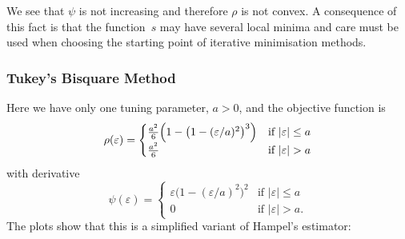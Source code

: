 \documentclass[
  a4paper,
]{article}
\theoremstyle{definition}
\theoremstyle{definition}
\theoremstyle{definition}
\theoremstyle{definition}
\theoremstyle{remark}
\begin{document}
We see that \(\psi\) is not increasing and therefore \(\rho\) is not convex. A
consequence of this fact is that the function~\(s\) may have several local minima
and care must be used when choosing the starting point of iterative
minimisation methods.

\hypertarget{tukeys-bisquare-method}{%
\subsubsection{Tukey's Bisquare Method}\label{tukeys-bisquare-method}}

Here we have only one tuning parameter, \(a > 0\), and the objective
function is
\begin{equation*}
  \rho(\varepsilon)
  = \begin{cases}
  \frac{a^2}{6} \Bigl( 1 - \bigl( 1 - (\varepsilon/a)^2 \bigr)^3 \Bigr)
                & \mbox{if } |\varepsilon| \leq a \\
  \frac{a^2}{6} & \mbox{if } |\varepsilon| > a
  \end{cases}
\end{equation*}
with derivative
\begin{equation*}
  \psi(\varepsilon)
  = \begin{cases}
  \varepsilon\bigl( 1 - (\varepsilon/a)^2 \bigr)^2
        & \mbox{if } |\varepsilon| \leq a \\
      0 & \mbox{if } |\varepsilon| > a.
  \end{cases}
\end{equation*}
The plots show that this is a simplified variant of Hampel's
estimator:
\end{document}
